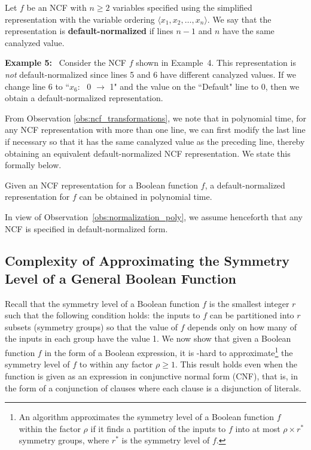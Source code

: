 \begin{definition}
\label{def:normalized}
Let $f$ be an NCF with $n \geq 2$ variables specified using
the simplified representation with 
the variable ordering $\langle x_1, x_2, \ldots, x_n\rangle$.
We say that the representation is {\bf default-normalized} if
lines $n-1$ and $n$ have the same canalyzed value.
\end{definition}

\noindent
\textbf{Example 5:}~ 
Consider the NCF $f$ shown in Example~4. 
This representation is \emph{not} default-normalized since lines 5 and 6
have different canalyzed values.
If we change line 6 to ``$x_6$:~ 0 $\longrightarrow$ 1" and the
value on the ``Default" line to 0, then we obtain 
a default-normalized representation. 

\medskip
From Observation \ref{obs:ncf_transformations},
we note that in polynomial time, for any NCF representation with more than one line,
we can first modify the last line if necessary 
so that it has the same canalyzed value as the preceding line,
thereby obtaining an equivalent default-normalized NCF representation.
We state this formally below.

\begin{observation}\label{obs:normalization_poly}
Given an NCF representation for a Boolean function $f$, a default-normalized
representation for $f$ can be obtained in polynomial time. \QED
\end{observation}

\noindent
In view of Observation~\ref{obs:normalization_poly},
we assume henceforth that any NCF is specified in default-normalized form.

\subsection{Complexity of Approximating the Symmetry Level of a 
General Boolean Function}
\label{sse:symmetry_level_hardness}

Recall that the symmetry level of a Boolean function $f$ is the smallest
integer $r$ such that the following condition holds:
the  inputs to $f$ can be partitioned into $r$ subsets 
(symmetry groups) so that the value of $f$ depends only on 
how many of the inputs in each group have the value 1.
We now show that given a Boolean function $f$
in the form of a Boolean expression, it is \cnp-hard to 
approximate\footnote{An algorithm approximates the symmetry
level of a Boolean function $f$ within the factor $\rho$ if it finds a
partition of the inputs to $f$ into at most $\rho \times r^*$ symmetry
groups, where $r^*$ is the symmetry level of $f$.}
the symmetry level of $f$ to within any factor $\rho \geq 1$.
This result holds even when the function is given as an expression
in conjunctive normal form (CNF), that is, in the form of a conjunction
of clauses where each clause is a disjunction of literals. 

